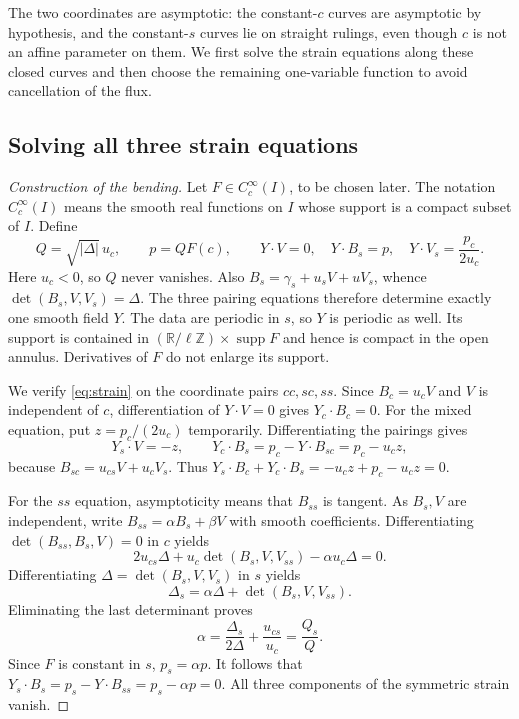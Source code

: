 \documentclass[11pt]{amsart}
\theoremstyle{definition}
\newcommand{\R}{\mathbb R}
\DeclareMathOperator{\supp}{supp}
\begin{document}
The two coordinates are asymptotic: the constant-$c$ curves are
asymptotic by hypothesis, and the constant-$s$ curves lie on straight
rulings, even though $c$ is not an affine parameter on them.
We first solve the strain equations along these closed curves and
then choose the remaining one-variable function to avoid cancellation
of the flux.

\subsection{Solving all three strain equations}
\begin{proof}[Construction of the bending]
Let $F\in C_c^\infty(I)$, to be chosen later. The notation
$C_c^\infty(I)$ means the smooth real functions on $I$ whose support
is a compact subset of $I$. Define
\begin{equation}\label{eq:pairings}
 Q=\sqrt{|\Delta|}\,u_c,\qquad p=QF(c),\qquad
 Y\cdot V=0,\quad Y\cdot B_s=p,\quad
 Y\cdot V_s=\frac{p_c}{2u_c}.
\end{equation}
Here $u_c<0$, so $Q$ never vanishes. Also
$B_s=\gamma_s+u_sV+uV_s$, whence
$\det(B_s,V,V_s)=\Delta$.
The three pairing equations therefore determine exactly one smooth
field $Y$. The data are periodic in $s$, so $Y$ is periodic as
well. Its support is contained in
$(\R/\ell\mathbb Z)\times\supp F$ and hence is compact in the
open annulus. Derivatives of $F$ do not enlarge its support.

We verify \eqref{eq:strain} on the coordinate pairs $cc,sc,ss$.
Since $B_c=u_cV$ and $V$ is independent of $c$,
differentiation of $Y\cdot V=0$ gives
$Y_c\cdot B_c=0$. For the mixed equation, put
$z=p_c/(2u_c)$ temporarily. Differentiating the pairings gives
\[
 Y_s\cdot V=-z,\qquad
 Y_c\cdot B_s=p_c-Y\cdot B_{sc}=p_c-u_cz,
\]
because $B_{sc}=u_{cs}V+u_cV_s$.
Thus
$Y_s\cdot B_c+Y_c\cdot B_s=-u_cz+p_c-u_cz=0$.

For the $ss$ equation, asymptoticity means that $B_{ss}$ is tangent.
As $B_s,V$ are independent, write
$B_{ss}=\alpha B_s+\beta V$ with smooth coefficients.
Differentiating
$\det(B_{ss},B_s,V)=0$ in $c$ yields
\[
 2u_{cs}\Delta+
 u_c\det(B_s,V,V_{ss})-\alpha u_c\Delta=0.
\]
Differentiating $\Delta=\det(B_s,V,V_s)$ in $s$ yields
\[
 \Delta_s=\alpha\Delta+\det(B_s,V,V_{ss}).
\]
Eliminating the last determinant proves
\begin{equation}\label{eq:transport}
 \alpha=\frac{\Delta_s}{2\Delta}+\frac{u_{cs}}{u_c}
        =\frac{Q_s}{Q}.
\end{equation}
Since $F$ is constant in $s$, $p_s=\alpha p$.
It follows that
$Y_s\cdot B_s=p_s-Y\cdot B_{ss}=p_s-\alpha p=0$.
All three components of the symmetric strain vanish.
\end{proof}
\end{document}
